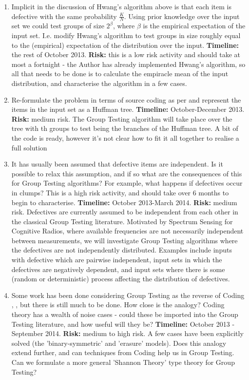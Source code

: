 \begin{enumerate}
\item Implicit in the discussion of Hwang's algorithm above is that each item is defective with the same probability \( \frac{K}{N} \). Using prior knowledge over the input set we could test groups of size \(2^\beta\), where \(\beta\) is the empirical expectation of the input set. I.e. modify Hwang's algorithm to test groups in size roughly equal to the (empirical) expectation of the distribution over the input. \textbf{Timeline:} the rest of October 2013. \textbf{Risk: } this is a low risk activity and should take at most a fortnight - the Author has already implemented Hwang's algorithm, so all that needs to be done is to calculate the empiracle mean of the input distribution, and characterise the algorithm in a few cases.

\item Re-formulate the problem in terms of source coding as per \cite{Aldroubi} and represent the items in the input set as a Huffman tree. \textbf{Timeline:} October-December 2013. \textbf{Risk: } medium risk. The Group Testing algorithm will take place over the tree with th groups to test being the branches of the Huffman tree. A bit of the code is ready, however it's not clear how to fit it all together to realise a full solution

\item It has usually been assumed that defective items are independent. Is it possible to relax this assumption, and if so what are the consequences of this for Group Testing algorithms? For example, what happens if defectives occur in clumps? This is a high risk activity, and should take over 6 months to begin to characterise. \textbf{Timeline: }
October 2013-March 2014. \textbf{Risk: } medium risk. Defectives are currently assumed to be independent from each other in the classical Group Testing literature. Motivated by Spectrum Sensing for Cognitive Radios, where available frequencies are not necessarily independent between measurements, we will investigate Group Testing algorithms where the defectives are not independently distributed. Examples include inputs with defective which are pairwise independent, input sets in which the defectives are negatively dependent, and input sets where there is some (random or deterministic) process affecting the distribution of defectives.

\item Some work has been done considering Group Testing as the reverse of Coding \cite{Wadayama2013}, \cite{Sejdinovic2010}, but there is still much to be done. How close is the analogy? Coding theory has a wealth of noise cases - could these be imported into the Group Testing literature, and how useful will they be? \textbf{Timeline: } October 2013 - September 2014. \textbf{Risk: } medium to high risk. A few cases have been explicitly solved (the 'binary-symmetric' and 'erasure' models). Does this analogy extend further, and can techniques from Coding help us in Group Testing. Can we formulate a more general 'Shannon Theory' type theory for Group Testing?


\end{enumerate}
